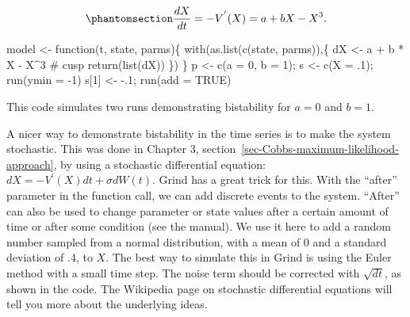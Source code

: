 \documentclass[
  a4paper,
  DIV=11,
  numbers=noendperiod,
  oneside]{scrreprt}
\newenvironment{Shaded}{}{}
\newcommand{\AttributeTok}[1]{\textcolor[rgb]{0.84,0.23,0.29}{#1}}
\newcommand{\CommentTok}[1]{\textcolor[rgb]{0.42,0.45,0.49}{#1}}
\newcommand{\ConstantTok}[1]{\textcolor[rgb]{0.00,0.36,0.77}{#1}}
\newcommand{\ControlFlowTok}[1]{\textcolor[rgb]{0.84,0.23,0.29}{#1}}
\newcommand{\DecValTok}[1]{\textcolor[rgb]{0.00,0.36,0.77}{#1}}
\newcommand{\FunctionTok}[1]{\textcolor[rgb]{0.44,0.26,0.76}{#1}}
\newcommand{\NormalTok}[1]{\textcolor[rgb]{0.14,0.16,0.18}{#1}}
\newcommand{\OtherTok}[1]{\textcolor[rgb]{0.44,0.26,0.76}{#1}}
\newcommand{\SpecialCharTok}[1]{\textcolor[rgb]{0.00,0.36,0.77}{#1}}
\begin{document}
\begin{equation}\phantomsection\label{eq-ch4n-5-old-25}{
\frac{dX}{dt} = - V^{'}(X) = {a + bX - X}^{3}.
}\end{equation}

\begin{Shaded}
\begin{Highlighting}[]
\NormalTok{model }\OtherTok{\textless{}{-}} \ControlFlowTok{function}\NormalTok{(t, state, parms)\{}
  \FunctionTok{with}\NormalTok{(}\FunctionTok{as.list}\NormalTok{(}\FunctionTok{c}\NormalTok{(state, parms)),\{}
\NormalTok{    dX }\OtherTok{\textless{}{-}}\NormalTok{  a }\SpecialCharTok{+}\NormalTok{ b }\SpecialCharTok{*}\NormalTok{ X }\SpecialCharTok{{-}}\NormalTok{ X}\SpecialCharTok{\^{}}\DecValTok{3} \CommentTok{\# cusp}
    \FunctionTok{return}\NormalTok{(}\FunctionTok{list}\NormalTok{(dX))}
\NormalTok{  \})}
\NormalTok{\}}
\NormalTok{p }\OtherTok{\textless{}{-}} \FunctionTok{c}\NormalTok{(}\AttributeTok{a =} \DecValTok{0}\NormalTok{, }\AttributeTok{b =} \DecValTok{1}\NormalTok{); s }\OtherTok{\textless{}{-}} \FunctionTok{c}\NormalTok{(}\AttributeTok{X =}\NormalTok{ .}\DecValTok{1}\NormalTok{); }\FunctionTok{run}\NormalTok{(}\AttributeTok{ymin =} \SpecialCharTok{{-}}\DecValTok{1}\NormalTok{)}
\NormalTok{s[}\DecValTok{1}\NormalTok{] }\OtherTok{\textless{}{-}} \SpecialCharTok{{-}}\NormalTok{.}\DecValTok{1}\NormalTok{; }\FunctionTok{run}\NormalTok{(}\AttributeTok{add =} \ConstantTok{TRUE}\NormalTok{)}
\end{Highlighting}
\end{Shaded}

This code simulates two runs demonstrating bistability for \(a = 0\) and
\(b = 1\).

A nicer way to demonstrate bistability in the time series is to make the
system stochastic. This was done in Chapter 3,
section~\ref{sec-Cobbs-maximum-likelihood-approach}, by using a
stochastic differential equation: \(dX = - V^{'}(X)dt + \sigma dW(t)\).
Grind has a great trick for this. With the ``after'' parameter in the
function call, we can add discrete events to the system. ``After'' can
also be used to change parameter or state values after a certain amount
of time or after some condition (see the manual). We use it here to add
a random number sampled from a normal distribution, with a mean of 0 and
a standard deviation of .4, to \(X\). The best way to simulate this in
Grind is using the Euler method with a small time step. The noise term
should be corrected with \(\sqrt{dt}\), as shown in the code. The
Wikipedia page on stochastic differential equations will tell you more
about the underlying ideas.
\end{document}
